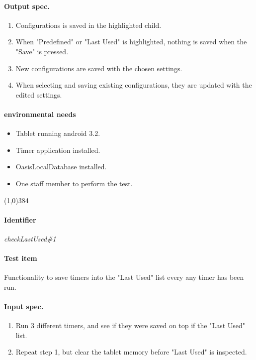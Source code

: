 \paragraph{Output spec.}
	\begin{enumerate}
		\item Configurations is saved in the highlighted child.
		\item When "Predefined" or "Last Used" is highlighted, nothing is saved when the "Save" is pressed.
		\item New configurations are saved with the chosen settings.
		\item When selecting and saving existing configurations, they are updated with the edited settings.
	\end{enumerate}
\paragraph{environmental needs}
	\begin{itemize}
		\item Tablet running android 3.2.
		\item Timer application installed.
		\item OasisLocalDatabase installed.
		\item One staff member to perform the test.
	\end{itemize}
\begin{center}
	\line(1,0){384}
\end{center}

\paragraph{Identifier}
	\textit{checkLastUsed\#1}
\paragraph{Test item}
	Functionality to save timers into the "Last Used" list every any timer has been run.
\paragraph{Input spec.}
	\begin{enumerate}
		\item Run 3 different timers, and see if they were saved on top if the "Last Used" list.
		\item Repeat step 1, but clear the tablet memory before "Last Used" is inspected.
	\end{enumerate}
